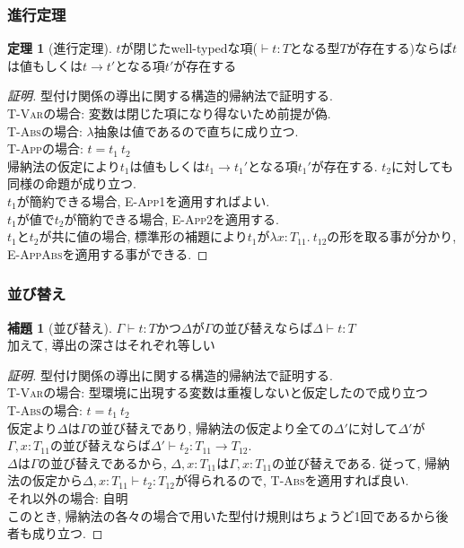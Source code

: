 \documentclass[dvipdfmx,cjk,xcolor=dvipsnames,envcountsect,notheorems,aspectratio=169]{beamer}
\theoremstyle{definition}
\newtheorem{theorem}{定理}
\newtheorem{lemma}{補題}
\begin{document}
\begin{frame}
  \frametitle{進行定理}
  \renewcommand{\thetheorem}{9.3.5}
  \begin{theorem}[進行定理]
		$t$が閉じたwell-typedな項($\vdash t:T$となる型$T$が存在する)ならば$t$は値もしくは$t \longrightarrow t'$となる項$t'$が存在する
  \end{theorem}
  \begin{proof}[証明]
		型付け関係の導出に関する構造的帰納法で証明する.\\
		\textsc{T-Var}の場合: 変数は閉じた項になり得ないため前提が偽.\\
		\textsc{T-Abs}の場合: $\lambda$抽象は値であるので直ちに成り立つ.\\
		\textsc{T-App}の場合: $t=t_1~t_2$\\ 
		帰納法の仮定により$t_1$は値もしくは$t_1 \longrightarrow t_1'$となる項$t_1'$が存在する. $t_2$に対しても同様の命題が成り立つ.\\
		$t_1$が簡約できる場合, \textsc{E-App1}を適用すればよい.\\
		$t_1$が値で$t_2$が簡約できる場合, \textsc{E-App2}を適用する.\\
		$t_1$と$t_2$が共に値の場合, 標準形の補題により$t_1$が$\lambda x:T_{11}.~t_{12}$の形を取る事が分かり, \textsc{E-AppAbs}を適用する事ができる.
  \end{proof}
\end{frame}

\begin{frame}
  \frametitle{並び替え}
  \renewcommand{\thelemma}{9.3.6}
  \begin{lemma}[並び替え]
		$\Gamma \vdash t : T$かつ$\Delta$が$\Gamma$の並び替えならば$\Delta \vdash t : T$ \\
		加えて, 導出の深さはそれぞれ等しい
  \end{lemma}
  \begin{proof}[証明]
		型付け関係の導出に関する構造的帰納法で証明する.\\
		\textsc{T-Var}の場合: 型環境に出現する変数は重複しないと仮定したので成り立つ\\
		\textsc{T-Abs}の場合: $t=t_1~t_2$\\
		仮定より$\Delta$は$\Gamma$の並び替えであり, 帰納法の仮定より全ての$\Delta'$に対して$\Delta'$が$\Gamma,x:T_{11}$の並び替えならば$\Delta ' \vdash t_2:T_{11} \to T_{12}$.\\
		$\Delta$は$\Gamma$の並び替えであるから, $\Delta, x:T_{11}$は$\Gamma, x:T_{11}$の並び替えである.
		従って, 帰納法の仮定から$\Delta,x:T_{11} \vdash t_2:T_{12}$が得られるので, \textsc{T-Abs}を適用すれば良い.\\
		それ以外の場合: 自明\\
		このとき, 帰納法の各々の場合で用いた型付け規則はちょうど1回であるから後者も成り立つ.
  \end{proof}
\end{frame}
\end{document}
